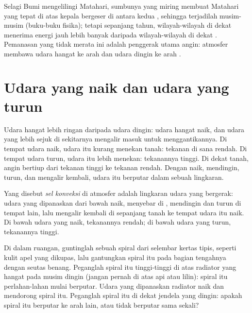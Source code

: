 Selagi Bumi mengelilingi Matahari, sumbunya yang miring membuat Matahari
yang tepat di atas kepala bergeser di antara kedua , sehingga
terjadilah musim-musim (buku-buku fisika); tetapi sepanjang tahun,
wilayah-wilayah di dekat  menerima energi jauh lebih banyak
daripada wilayah-wilayah di dekat . Pemanasan yang tidak merata ini
adalah penggerak utama angin: atmosfer membawa udara hangat ke arah 
dan udara dingin ke arah .

\section{Udara yang naik dan udara yang turun}

Udara hangat lebih ringan daripada udara dingin: udara hangat naik, dan
udara yang lebih sejuk di sekitarnya mengalir masuk untuk menggantikannya.
Di tempat udara naik, udara itu kurang menekan tanah: tekanan di sana
rendah. Di tempat udara turun, udara itu lebih menekan: tekanannya tinggi.
Di dekat tanah, angin bertiup dari tekanan tinggi ke tekanan rendah. Dengan
naik, mendingin, turun, dan mengalir kembali, udara itu berputar dalam
sebuah lingkaran.

\begin{definition}\label{def:g8:winds-global-circulation:convection-cell}
Yang disebut \emph{sel konveksi} di atmosfer adalah
lingkaran udara yang bergerak: udara yang dipanaskan dari bawah naik,
menyebar di , mendingin dan turun di tempat lain, lalu mengalir
kembali di sepanjang tanah ke tempat udara itu naik. Di bawah udara yang
naik, tekanannya rendah; di bawah udara yang turun, tekanannya tinggi.
\end{definition}

\begin{inthelab}
Di dalam ruangan, guntinglah sebuah spiral dari selembar kertas tipis,
seperti kulit apel yang dikupas, lalu gantungkan spiral itu pada bagian
tengahnya dengan seutas benang. Peganglah spiral itu tinggi-tinggi di atas
radiator yang hangat pada musim dingin (jangan pernah di atas api atau
lilin): spiral itu perlahan-lahan mulai berputar. Udara yang dipanaskan
radiator naik dan mendorong spiral itu. Peganglah spiral itu di dekat
jendela yang dingin: apakah spiral itu berputar ke arah lain, atau tidak
berputar sama sekali?
\end{inthelab}

